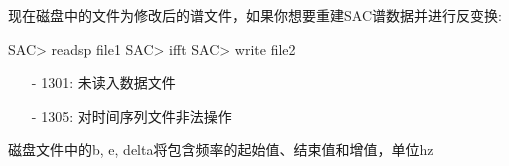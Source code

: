 现在磁盘中的文件为修改后的谱文件，如果你想要重建SAC谱数据并进行反变换:
\begin{SACCode}
SAC> readsp file1
SAC> ifft
SAC> write file2
\end{SACCode}

\begin{itemize}
\item[-]1301: 未读入数据文件
\item[-]1305: 对时间序列文件非法操作
\end{itemize}

磁盘文件中的b, e, delta将包含频率的起始值、结束值和增值，单位hz

